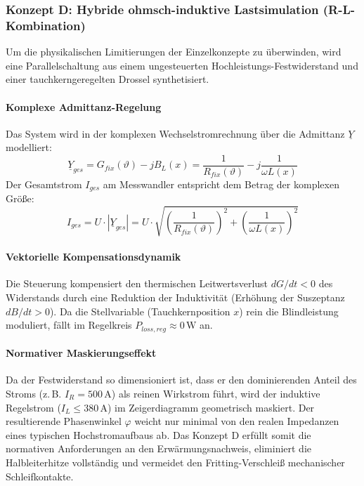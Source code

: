 \subsubsection{Konzept D: Hybride ohmsch-induktive Lastsimulation (R-L-Kombination)}

Um die physikalischen Limitierungen der Einzelkonzepte zu überwinden, wird eine Parallelschaltung aus einem ungesteuerten Hochleistungs-Festwiderstand und einer tauchkerngeregelten Drossel synthetisiert.
\paragraph{Komplexe Admittanz-Regelung}
Das System wird in der komplexen Wechselstromrechnung über die Admittanz $\underline{Y}$ modelliert:
\begin{equation}
    \underline{Y}_{ges} = G_{fix}(\vartheta) - j B_L(x) = \frac{1}{R_{fix}(\vartheta)} - j \frac{1}{\omega L(x)}
\end{equation}
Der Gesamtstrom $I_{ges}$ am Messwandler entspricht dem Betrag der komplexen Größe:
\begin{equation}
    I_{ges} = U \cdot |\underline{Y}_{ges}| = U \cdot \sqrt{\left(\frac{1}{R_{fix}(\vartheta)}\right)^2 + \left(\frac{1}{\omega L(x)}\right)^2}
\end{equation}
\paragraph{Vektorielle Kompensationsdynamik}
Die Steuerung kompensiert den thermischen Leitwertsverlust $dG/dt < 0$ des Widerstands durch eine Reduktion der Induktivität (Erhöhung der Suszeptanz $dB/dt > 0$). Da die Stellvariable (Tauchkernposition $x$) rein die Blindleistung moduliert, fällt im Regelkreis $P_{loss,reg} \approx 0\,\text{W}$ an. 
\paragraph{Normativer Maskierungseffekt}
Da der Festwiderstand so dimensioniert ist, dass er den dominierenden Anteil des Stroms (z.\,B. $I_R = 500\,\text{A}$) als reinen Wirkstrom führt, wird der induktive Regelstrom ($I_L \le 380\,\text{A}$) im Zeigerdiagramm geometrisch maskiert. Der resultierende Phasenwinkel $\varphi$ weicht nur minimal von den realen Impedanzen eines typischen Hochstromaufbaus ab. Das Konzept D erfüllt somit die normativen Anforderungen an den Erwärmungsnachweis, eliminiert die Halbleiterhitze vollständig und vermeidet den Fritting-Verschleiß mechanischer Schleifkontakte.

